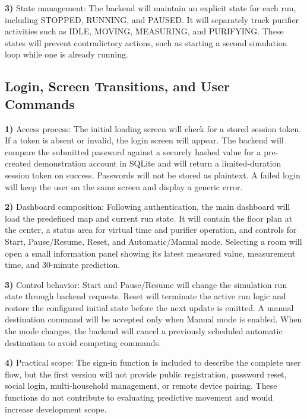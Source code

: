 \documentclass[conference]{IEEEtran}
\begin{document}
\par\noindent\textbf{3)} State management:
The backend will maintain an explicit state for each run, including STOPPED, RUNNING, and PAUSED. It will separately track purifier activities such as IDLE, MOVING, MEASURING, and PURIFYING. These states will prevent contradictory actions, such as starting a second simulation loop while one is already running.

\subsection{Login, Screen Transitions, and User Commands}
\par\noindent\textbf{1)} Access process:
The initial loading screen will check for a stored session token. If a token is absent or invalid, the login screen will appear. The backend will compare the submitted password against a securely hashed value for a pre-created demonstration account in SQLite and will return a limited-duration session token on success. Passwords will not be stored as plaintext. A failed login will keep the user on the same screen and display a generic error.

\par\noindent\textbf{2)} Dashboard composition:
Following authentication, the main dashboard will load the predefined map and current run state. It will contain the floor plan at the center, a status area for virtual time and purifier operation, and controls for Start, Pause/Resume, Reset, and Automatic/Manual mode. Selecting a room will open a small information panel showing its latest measured value, measurement time, and 30-minute prediction.

\par\noindent\textbf{3)} Control behavior:
Start and Pause/Resume will change the simulation run state through backend requests. Reset will terminate the active run logic and restore the configured initial state before the next update is emitted. A manual destination command will be accepted only when Manual mode is enabled. When the mode changes, the backend will cancel a previously scheduled automatic destination to avoid competing commands.

\par\noindent\textbf{4)} Practical scope:
The sign-in function is included to describe the complete user flow, but the first version will not provide public registration, password reset, social login, multi-household management, or remote device pairing. These functions do not contribute to evaluating predictive movement and would increase development scope.
\end{document}
